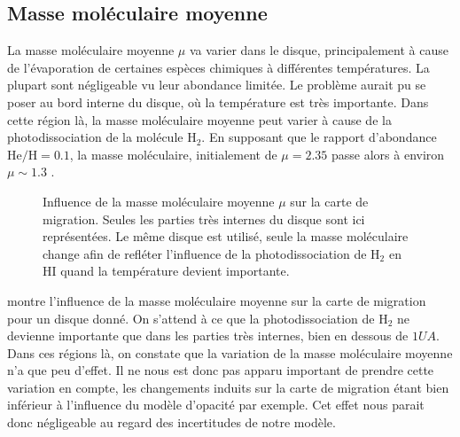 \subsection{Masse moléculaire moyenne}
La masse moléculaire moyenne $\mu$ va varier dans le disque, principalement à cause de l'évaporation de certaines
espèces chimiques à différentes températures. La plupart sont négligeable vu leur abondance limitée. Le problème
aurait pu se poser au bord interne du disque, où la température est très importante. Dans cette région là, la masse moléculaire
moyenne peut varier à cause de la photodissociation de la molécule $\mathrm{H_2}$. En supposant que le rapport d'abondance
$\mathrm{He/H}=0.1$, la masse moléculaire, initialement de $\mu=2.35$ passe alors à environ $\mu\sim 1.3$ \citep[Annexe
A]{hure2000transition}.

\begin{figure}[htbp]
\centering
{}\hfill
{}
\caption{Influence de la masse moléculaire moyenne $\mu$ sur la carte de migration. Seules les
parties très internes du disque sont ici représentées. Le même disque est utilisé, seule la masse
moléculaire change afin de refléter l'influence de la photodissociation de $\mathrm{H_2}$ en
$\mathrm{HI}$ quand la température devient importante. }\label{fig:migration_map_mmw}
\end{figure}

 montre l'influence de la masse moléculaire moyenne sur la carte de migration pour un disque
donné. On s'attend à ce que la photodissociation de $\mathrm{H_2}$ ne devienne importante que dans les parties très internes,
bien en dessous de $1\unit{UA}$. Dans ces régions là, on constate que la variation de la masse moléculaire moyenne n'a que peu
d'effet. Il ne nous est donc pas apparu important de prendre cette variation en compte, les changements induits sur la carte de
migration étant bien inférieur à l'influence du modèle d'opacité par exemple. Cet effet nous parait donc négligeable au regard
des incertitudes de notre modèle.


